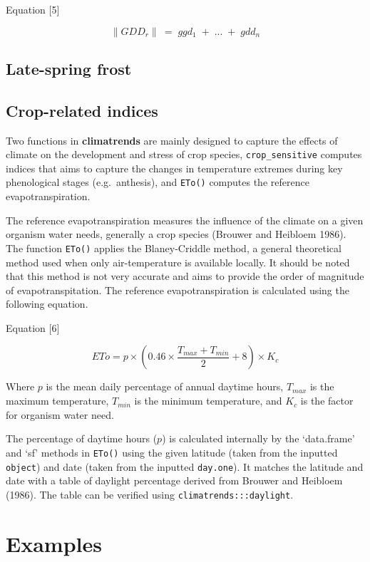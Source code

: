 \documentclass[
]{article}
\begin{document}
Equation {[}5{]}

\[\parallel GDD_{r} \parallel \: = \; ggd_1 \;+ \; ...  \; +  \; gdd_n\]

\hypertarget{late-spring-frost}{%
\subsection{Late-spring frost}\label{late-spring-frost}}

\hypertarget{crop-related-indices}{%
\subsection{Crop-related indices}\label{crop-related-indices}}

Two functions in \textbf{climatrends} are mainly designed to capture the
effects of climate on the development and stress of crop species,
\texttt{crop\_sensitive} computes indices that aims to capture the
changes in temperature extremes during key phenological stages
(e.g.~anthesis), and \texttt{ETo()} computes the reference
evapotranspiration.

The reference evapotranspiration measures the influence of the climate
on a given organism water needs, generally a crop species (Brouwer and
Heibloem 1986). The function \texttt{ETo()} applies the Blaney-Criddle
method, a general theoretical method used when only air-temperature is
available locally. It should be noted that this method is not very
accurate and aims to provide the order of magnitude of
evapotranspitation. The reference evapotranspiration is calculated using
the following equation.

Equation {[}6{]}

\[ETo = p \times \left(0.46 \times \frac{T_{max} + T_{min}}{2} + 8 \right) \times K_c\]

Where \(p\) is the mean daily percentage of annual daytime hours,
\(T_{max}\) is the maximum temperature, \(T_{min}\) is the minimum
temperature, and \(K_c\) is the factor for organism water need.

The percentage of daytime hours (\(p\)) is calculated internally by the
`data.frame' and `sf' methods in \texttt{ETo()} using the given latitude
(taken from the inputted \texttt{object}) and date (taken from the
inputted \texttt{day.one}). It matches the latitude and date with a
table of daylight percentage derived from Brouwer and Heibloem (1986).
The table can be verified using \texttt{climatrends:::daylight}.

\hypertarget{examples}{%
\section{Examples}\label{examples}}
\end{document}
